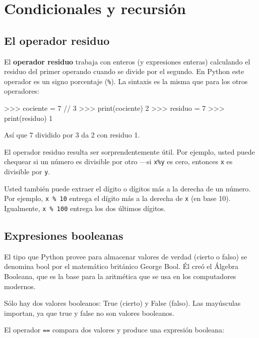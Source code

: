 
\chapter{Condicionales y recursión}

\section{El operador residuo}

 

El \textbf{operador residuo} trabaja con enteros (y expresiones enteras)
calculando el residuo del primer operando cuando se divide por el
segundo. En Python este operador es un signo porcentaje (\texttt{\%}).
La sintaxis es la misma que para los otros operadores:

\begin{pyconcode}
>>> cociente = 7 // 3
>>> print(cociente)
2
>>> residuo = 7 %
>>> print(residuo)
1
\end{pyconcode}

Así que 7 dividido por 3 da 2 con residuo 1.

El operador residuo resulta ser sorprendentemente útil. Por ejemplo,
usted puede chequear si un número es divisible por otro —si \texttt{x\%y}
es cero, entonces \texttt{x} es divisible por \texttt{y}.

Usted también puede extraer el dígito o dígitos más a la derecha de
un número. Por ejemplo, \texttt{x \% 10} entrega el dígito más a la
derecha de \texttt{x} (en base 10). Igualmente, \texttt{x \% 100}
entrega los dos últimos dígitos.

\section{Expresiones booleanas}

  

El tipo que Python provee para almacenar valores de verdad (cierto
o falso) se denomina bool por el matemático británico George Bool.
Él creó el Álgebra Booleana, que es la base para la aritmética que
se usa en los computadores modernos.

Sólo hay dos valores booleanos: True (cierto) y False (falso). Las
mayúsculas importan, ya que true y false no son valores booleanos.

El operador \texttt{==} compara dos valores y produce una expresión
booleana:

